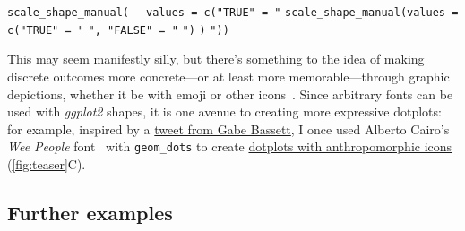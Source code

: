 \documentclass[journal]{vgtc}                     %
\providecommand{\DIFaddbegin}{} %
\providecommand{\DIFaddend}{} %
\providecommand{\DIFdelbegin}{} %
\providecommand{\DIFdelend}{} %
\begin{document}
{
\hfill\break
\small
\centering
\varwidth{\linewidth}
\noindent
\DIFdelbegin %
{\color{red}%
\verb|scale_shape_manual(|%
}%
%
{\color{red}%
\verb|  values = c("TRUE" = "|%
}%
\DIFdelend \DIFaddbegin {\color{blue}%
\verb|scale_shape_manual(values = c("TRUE" = "|%
}%
\DIFaddend \smiley\verb|", "FALSE" = "|\frowny\DIFdelbegin %
{\color{red}%
\verb|")|%
}%
%
{\color{red}%
\verb|)|  
}%
\DIFdelend \DIFaddbegin {\color{blue}%
\verb|"))|%
}%
\DIFaddend \endvarwidth%
\par\DIFdelbegin %
\DIFdelend %
\DIFaddbegin \vspace{.1\belowdisplayskip}%
\DIFaddend \hfill\break%
}
This may seem manifestly silly, but there's something to the idea of making discrete outcomes more concrete---or at least more memorable---through graphic depictions, whether it be with emoji or other icons~\cite{haroz2015isotype}. Since arbitrary fonts can be used with \textit{ggplot2} shapes, it is one avenue to creating more expressive dotplots: for example, inspired by a \href{https://twitter.com/gdbassett/status/1519067260555513859?s=20}{tweet from Gabe Bassett}, I once used Alberto Cairo's \textit{Wee People} font~\cite{cairo2018weepeople} with \texttt{geom\_dots} to create \href{https://github.com/mjskay/uncertainty-examples/blob/master/weepeople_dotplots.md}{dotplots with anthropomorphic icons} (\cref{fig:teaser}C).



\subsection{Further examples}
\end{document}
